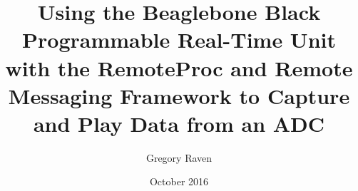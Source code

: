 \documentclass[a4paper,12pt]{book}
\begin{document}
\author{Gregory Raven}
\title{Using the Beaglebone Black Programmable Real-Time Unit with the RemoteProc and Remote Messaging Framework to Capture and Play Data from an ADC}
\date{October 2016}

%
\frontmatter

\maketitle
\tableofcontents

\mainmatter












\backmatter
\end{document}
